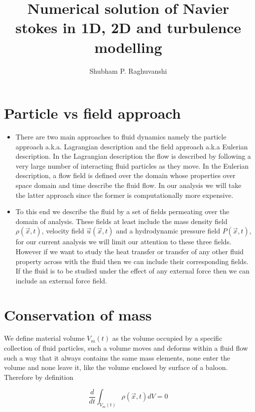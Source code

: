 \documentclass{article}		%
\title{\textbf{Numerical solution of Navier stokes in 1D, 2D and turbulence modelling}}
\author{Shubham P. Raghuvanshi}
\begin{document}
\maketitle
\newpage


\section{Particle vs field approach} 

\begin{itemize}
	\item 	There are two main approaches to fluid dynamics namely the particle approach a.k.a. Lagrangian description and the field approach a.k.a Eulerian description. In the Lagrangian description the flow is described by following a very large number of interacting fluid particles as they move. In the Eulerian description, a flow field is defined over the domain whose properties over space domain and time describe the fluid flow. In our analysis we will take the latter approach since the former is computationally more expensive.  
	
	\item To this end we describe the fluid by a set of fields permeating over the domain of analysis. These fields at least include the mass density field $\rho(\vec{x},t)$, velocity field $\vec{u}(\vec{x},t)$ and a hydrodynamic pressure field $P(\vec{x},t)$, for our current analysis we will limit our attention to these three fields. However if we want to study the heat transfer or transfer of any other fluid property across with the fluid then we can include their corresponding fields. If the fluid is to be studied under the effect of any external force then we can include an external force field.   	
\end{itemize}

\section{Conservation of mass} 
 We define  material volume $V_m(t)$  as the volume occupied by a specific collection of fluid particles, such a volume moves and deforms within a fluid flow such a way that it always contains
	the same mass elements, none enter the volume and none leave it, like the volume enclosed by surface of a baloon. Therefore by definition 
	
	\begin{equation}
	\frac{d}{dt} \int_{V_m(t)} \rho \left( \vec{x}, t   \right) dV  =0
	\end{equation}
	
\end{document}
